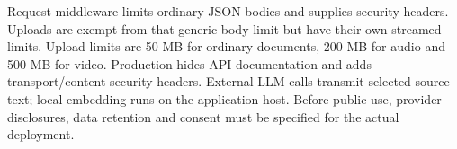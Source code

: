 Request middleware limits ordinary JSON bodies and supplies security headers. Uploads are exempt from that generic body limit but have their own streamed limits. Upload limits are 50 MB for ordinary documents, 200 MB for audio and 500 MB for video. Production hides API documentation and adds transport/content-security headers. External LLM calls transmit selected source text; local embedding runs on the application host. Before public use, provider disclosures, data retention and consent must be specified for the actual deployment.
